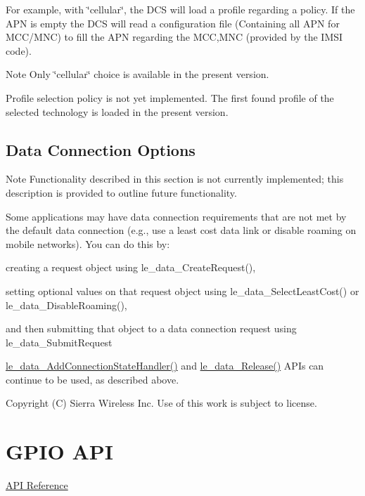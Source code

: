 For example, with \char`\"{}cellular\char`\"{}, the D\+C\+S will load a profile regarding a policy. If the A\+P\+N is empty the D\+C\+S will read a configuration file (Containing all A\+P\+N for M\+C\+C/\+M\+N\+C) to fill the A\+P\+N regarding the M\+C\+C,M\+N\+C (provided by the I\+M\+S\+I code).

\begin{DoxyNote}{Note}
Only \char`\"{}cellular\char`\"{} choice is available in the present version.

Profile selection policy is not yet implemented. The first found profile of the selected technology is loaded in the present version.
\end{DoxyNote}
\hypertarget{c_le_data_c_le_data_options}{}\subsection{Data Connection Options}\label{c_le_data_c_le_data_options}
\begin{DoxyNote}{Note}
Functionality described in this section is not currently implemented; this description is provided to outline future functionality.
\end{DoxyNote}
Some applications may have data connection requirements that are not met by the default data connection (e.\+g., use a least cost data link or disable roaming on mobile networks). You can do this by\+:
\begin{DoxyItemize}
\item creating a request object using le\+\_\+data\+\_\+\+Create\+Request(),
\item setting optional values on that request object using le\+\_\+data\+\_\+\+Select\+Least\+Cost() or le\+\_\+data\+\_\+\+Disable\+Roaming(),
\item and then submitting that object to a data connection request using le\+\_\+data\+\_\+\+Submit\+Request
\end{DoxyItemize}

\hyperlink{le__data__interface_8h_aebd3fc58774ed3f5a11f70d2317837dd}{le\+\_\+data\+\_\+\+Add\+Connection\+State\+Handler()} and \hyperlink{le__data__interface_8h_a1dc7cd8faed6b1ee02ea947cf02b8ee7}{le\+\_\+data\+\_\+\+Release()} A\+P\+Is can continue to be used, as described above.





Copyright (C) Sierra Wireless Inc. Use of this work is subject to license. \hypertarget{c_gpio}{}\section{G\+P\+I\+O A\+P\+I}\label{c_gpio}
\hyperlink{le__gpio__interface_8h}{A\+P\+I Reference}





